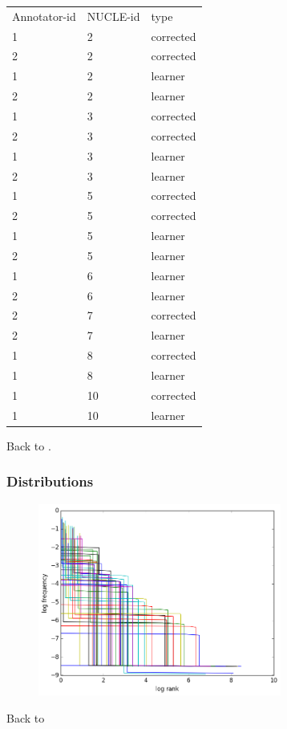 \documentclass{beamer}
\begin{document}
\begin{frame}[label=annotated]
\begin{table}[]
	\centering
	\scriptsize
	\begin{tabular}{lll}
		Annotator-id & NUCLE-id & type      \\
		1         & 2  & corrected \\
		2         & 2  & corrected \\
		1         & 2  & learner   \\
		2         & 2  & learner   \\
		1         & 3  & corrected \\
		2         & 3  & corrected \\
		1         & 3  & learner   \\
		2         & 3  & learner   \\
		1         & 5  & corrected \\
		2         & 5  & corrected \\
		1         & 5  & learner   \\
		2         & 5  & learner   \\
		1         & 6  & learner   \\
		2         & 6  & learner   \\
		2         & 7  & corrected \\
		2         & 7  & learner   \\
		1         & 8  & corrected \\
		1         & 8  & learner   \\
		1         & 10 & corrected \\
		1         & 10 & learner  
	\end{tabular}
\end{table}
\small Back to \hyperlink{UCCA}{}.
\end{frame}
\begin{frame}[label=alldists]
	\frametitle{Distributions}
	\begin{figure}
		\includegraphics[width=8cm]{exact_dists_plot}
	\end{figure}
		\small Back to \hyperlink{Dists}{}
\end{frame}
\end{document}
